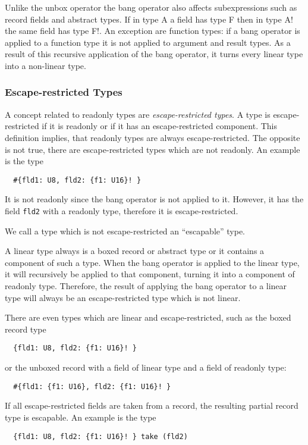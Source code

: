 \documentclass[a4paper]{report}
\newcommand{\code}[1]{\textnormal{\texttt{#1}}}
\begin{document}
Unlike the unbox operator the bang operator also affects subexpressions such as record fields and abstract types. If in
type A a field has type F then in type A! the same field has type F!. An exception are function types: if a bang
operator is applied to a function type it is not applied to argument and result types. 
As a result of this recursive application of the bang operator, it turns every linear type into a non-linear type. 

\subsubsection{Escape-restricted Types}

A concept related to readonly types are \textit{escape-restricted types}. A type is escape-restricted if it is readonly
or if it has an escape-restricted component. This definition implies, that readonly types are always escape-restricted. The opposite
is not true, there are escape-restricted types which are not readonly. An example is the type
\begin{verbatim}
  #{fld1: U8, fld2: {f1: U16}! }
\end{verbatim}
It is not readonly since the bang operator is not applied to it. However, it has the field \code{fld2}
with a readonly type, therefore it is escape-restricted.

We call a type which is not escape-restricted an ``escapable'' type.

A linear type always is a boxed record or abstract type or it contains a component of such a type. When the bang
operator is applied to the linear type, it will recursively be applied to that component, turning it into a 
component of readonly type. Therefore, the result of applying the bang operator to a linear type will always
be an escape-restricted type which is not linear.

There are even types which are linear and escape-restricted, such as the boxed record type
\begin{verbatim}
  {fld1: U8, fld2: {f1: U16}! }
\end{verbatim}
or the unboxed record with a field of linear type and a field of readonly type:
\begin{verbatim}
  #{fld1: {f1: U16}, fld2: {f1: U16}! }
\end{verbatim}

If all escape-restricted fields are taken from a record, the resulting partial record type is escapable.
An example is the type
\begin{verbatim}
  {fld1: U8, fld2: {f1: U16}! } take (fld2)
\end{verbatim}
\end{document}
